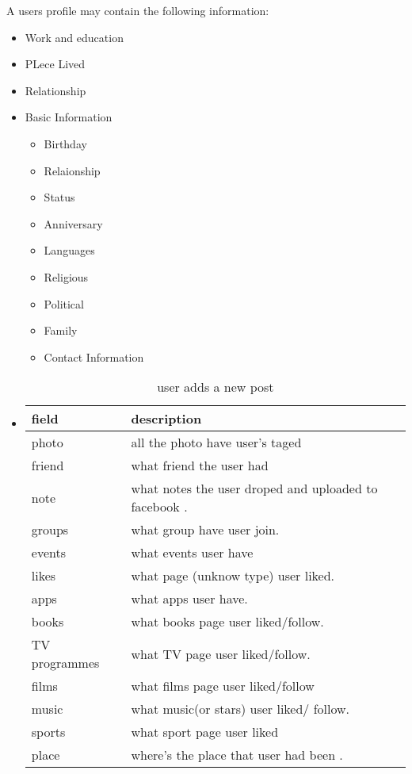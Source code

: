 A users profile may contain the following information:
\begin{itemize}
\item Work and education
\item PLece Lived
\item Relationship
\item Basic Information
    \begin{itemize}
        \item Birthday
        \item Relaionship
        \item Status
        \item Anniversary
        \item Languages
        \item Religious
        \item Political
        \item Family
        \item Contact Information
    \end{itemize}

\item \begin{table}[h]
    \centering
    \begin{tabular}{ll}
    field         & description\\ \hline
    photo         & all the photo have user's taged\\
    friend        & what friend the user had\\
    note          & what notes the user droped and uploaded to facebook .\\
    groups        & what group have user join.\\
    events        & what events user have\\
    likes         & what page (unknow type) user liked.\\
    apps          & what apps user have.\\
    books         & what books page user liked/follow.\\
    TV programmes & what TV page user liked/follow.\\
    films         & what films page user liked/follow\\
    music         & what music(or stars) user liked/ follow.\\
    sports        & what sport page user liked\\
    place         & where's the place that user had been .\\
    \end{tabular}
    \caption{user adds a new post}
    \end{table}
\end{itemize}

